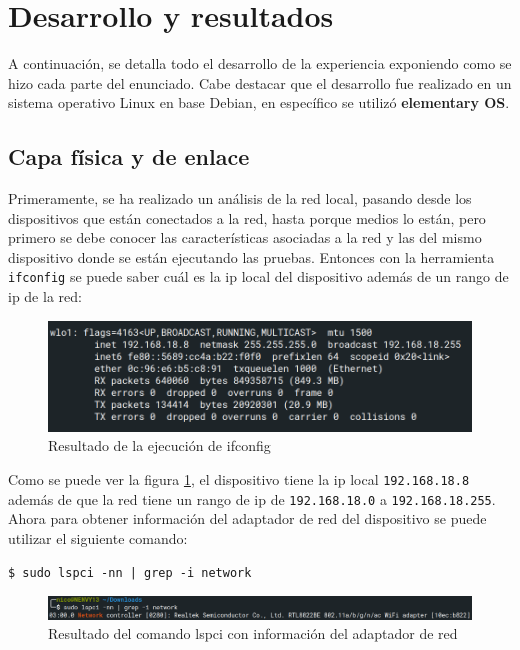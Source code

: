 \section{Desarrollo y resultados}

A continuación, se detalla todo el desarrollo de la experiencia exponiendo como se hizo cada parte del enunciado. Cabe destacar que el desarrollo fue realizado en un sistema operativo Linux en base Debian, en específico se utilizó \textbf{elementary OS}.

\subsection{Capa física y de enlace}
Primeramente, se ha realizado un análisis de la red local, pasando desde los dispositivos que están conectados a la red, hasta porque medios lo están, pero primero se debe conocer las características asociadas a la red y las del mismo dispositivo donde se están ejecutando las pruebas. Entonces con la herramienta \verb|ifconfig| se puede saber cuál es la ip local del dispositivo además de un rango de ip de la red:

\begin{figure}[!ht]
	\centering
	\includegraphics[scale=0.5]{images/ifconfig.png}
	\caption{Resultado de la ejecución de ifconfig}
	\label{if}
\end{figure}

\noindent Como se puede ver la figura \ref{if}, el dispositivo tiene la ip local \verb|192.168.18.8| además de que la red tiene un rango de ip de \verb|192.168.18.0| a \verb|192.168.18.255|.
\noindent Ahora para obtener información del adaptador de red del dispositivo se puede utilizar el siguiente comando:

\begin{lstlisting}
$ sudo lspci -nn | grep -i network
\end{lstlisting}

\begin{figure}[!ht]
	\centering
	\includegraphics[scale=0.3]{images/lscpi.png}
	\caption{Resultado del comando lspci con información del adaptador de red}
	\label{lspci}
\end{figure}


